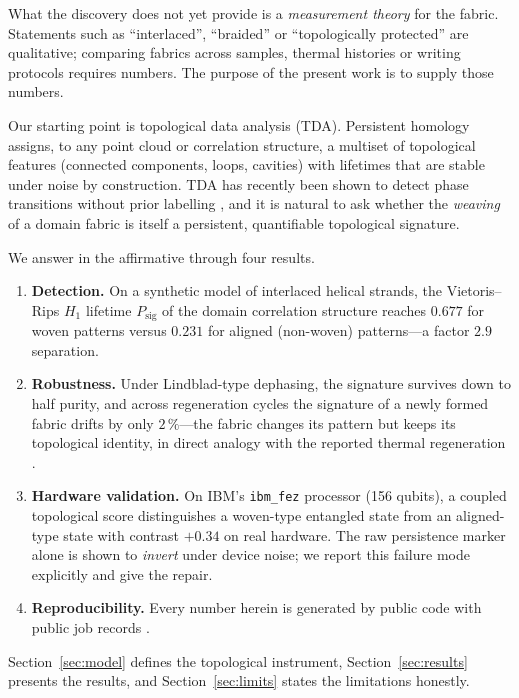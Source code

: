 \documentclass[11pt]{article}
\begin{document}
What the discovery does not yet provide is a \emph{measurement theory} for
the fabric. Statements such as ``interlaced'', ``braided'' or
``topologically protected'' are qualitative; comparing fabrics across
samples, thermal histories or writing protocols requires numbers. The
purpose of the present work is to supply those numbers.

Our starting point is topological data analysis (TDA). Persistent homology
\cite{Edelsbrunner,Carlsson} assigns, to any point cloud or correlation
structure, a multiset of topological features (connected components, loops,
cavities) with lifetimes that are stable under noise by construction. TDA
has recently been shown to detect phase transitions without prior labelling
\cite{Tran2021}, and it is natural to ask whether the \emph{weaving} of a
domain fabric is itself a persistent, quantifiable topological signature.

We answer in the affirmative through four results.

\begin{enumerate}
\item \textbf{Detection.} On a synthetic model of interlaced helical
strands, the Vietoris--Rips $H_1$ lifetime $P_{\mathrm{sig}}$ of the domain
correlation structure reaches $0.677$ for woven patterns versus $0.231$ for
aligned (non-woven) patterns---a factor $2.9$ separation.
\item \textbf{Robustness.} Under Lindblad-type dephasing, the signature
survives down to half purity, and across regeneration cycles the signature
of a newly formed fabric drifts by only $2\,\%$---the fabric changes its
pattern but keeps its topological identity, in direct analogy with the
reported thermal regeneration \cite{Xin2026}.
\item \textbf{Hardware validation.} On IBM's \texttt{ibm\_fez} processor
(156 qubits), a coupled topological score distinguishes a woven-type
entangled state from an aligned-type state with contrast $+0.34$ on real
hardware. The raw persistence marker alone is shown to \emph{invert} under
device noise; we report this failure mode explicitly and give the repair.
\item \textbf{Reproducibility.} Every number herein is generated by public
code with public job records \cite{repo}.
\end{enumerate}

Section~\ref{sec:model} defines the topological instrument,
Section~\ref{sec:results} presents the results, and
Section~\ref{sec:limits} states the limitations honestly.
\end{document}
